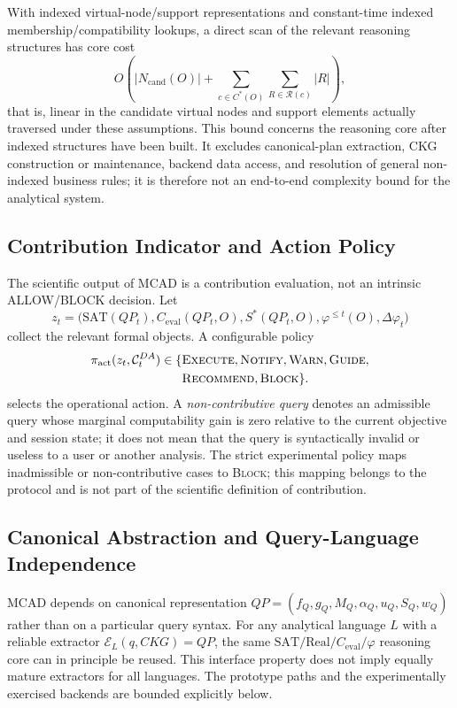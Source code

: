 \documentclass[journal]{IEEEtran}
\begin{document}
With indexed virtual-node/support representations and constant-time indexed membership/compatibility lookups, a direct scan of the relevant reasoning structures has core cost
\[
O\!\left(|N_{\mathrm{cand}}(O)|+\sum_{c\in C^*(O)}\sum_{R\in\mathcal R(c)}|R|\right),
\]
that is, linear in the candidate virtual nodes and support elements actually traversed under these assumptions. This bound concerns the reasoning core after indexed structures have been built. It excludes canonical-plan extraction, CKG construction or maintenance, backend data access, and resolution of general non-indexed business rules; it is therefore not an end-to-end complexity bound for the analytical system.

\subsection{Contribution Indicator and Action Policy}

The scientific output of MCAD is a contribution evaluation, not an intrinsic ALLOW/BLOCK decision. Let
\[
z_t=\bigl(\mathrm{SAT}(QP_t),C_{\mathrm{eval}}(QP_t,O),S^*(QP_t,O),
\varphi^{\le t}(O),\Delta\varphi_t\bigr)
\]
collect the relevant formal objects. A configurable policy
\[
\begin{aligned}
\pi_{\mathrm{act}}(z_t,\mathcal C_t^{DA})\in\{&\textsc{Execute},\textsc{Notify},\textsc{Warn},\textsc{Guide},\\
&\textsc{Recommend},\textsc{Block}\}.
\end{aligned}
\]
selects the operational action. A \emph{non-contributive query} denotes an admissible query whose marginal computability gain is zero relative to the current objective and session state; it does not mean that the query is syntactically invalid or useless to a user or another analysis. The strict experimental policy maps inadmissible or non-contributive cases to \textsc{Block}; this mapping belongs to the protocol and is not part of the scientific definition of contribution.

\subsection{Canonical Abstraction and Query-Language Independence}

MCAD depends on canonical representation $QP=(f_Q,g_Q,M_Q,\alpha_Q,u_Q,S_Q,w_Q)$ rather than on a particular query syntax. For any analytical language $L$ with a reliable extractor $\mathcal E_L(q,CKG)=QP$, the same $\mathrm{SAT}/\mathrm{Real}/C_{\mathrm{eval}}/\varphi$ reasoning core can in principle be reused. This interface property does not imply equally mature extractors for all languages. The prototype paths and the experimentally exercised backends are bounded explicitly below.
\end{document}

